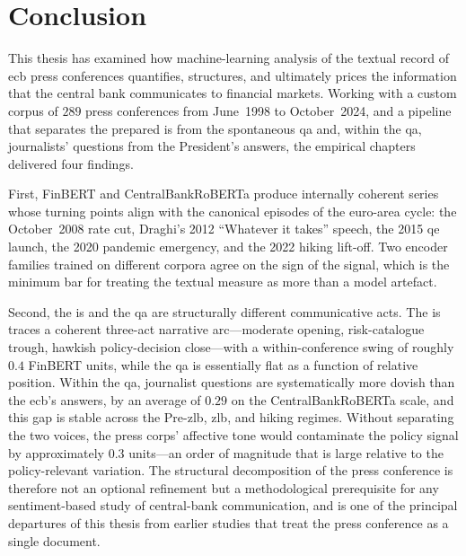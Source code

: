 \chapter*{Conclusion} %

This thesis has examined how machine-learning analysis of the textual record of \gls{ecb} press conferences quantifies, structures, and ultimately prices the information that the central bank communicates to financial markets. Working with a custom corpus of $289$ press conferences from June~1998 to October~2024, and a pipeline that separates the prepared \gls{is} from the spontaneous \gls{qa} and, within the \gls{qa}, journalists' questions from the President's answers, the empirical chapters delivered four findings.

First, FinBERT and CentralBankRoBERTa produce internally coherent series whose turning points align with the canonical episodes of the euro-area cycle: the October~2008 rate cut, Draghi's 2012 ``Whatever it takes'' speech, the 2015 \gls{qe} launch, the 2020 pandemic emergency, and the 2022 hiking lift-off. Two encoder families trained on different corpora agree on the sign of the signal, which is the minimum bar for treating the textual measure as more than a model artefact.

Second, the \gls{is} and the \gls{qa} are structurally different communicative acts. The \gls{is} traces a coherent three-act narrative arc---moderate opening, risk-catalogue trough, hawkish policy-decision close---with a within-conference swing of roughly $0.4$ FinBERT units, while the \gls{qa} is essentially flat as a function of relative position. Within the \gls{qa}, journalist questions are systematically more dovish than the \gls{ecb}'s answers, by an average of $0.29$ on the CentralBankRoBERTa scale, and this gap is stable across the Pre-\gls{zlb}, \gls{zlb}, and hiking regimes. Without separating the two voices, the press corps' affective tone would contaminate the policy signal by approximately $0.3$ units---an order of magnitude that is large relative to the policy-relevant variation. The structural decomposition of the press conference is therefore not an optional refinement but a methodological prerequisite for any sentiment-based study of central-bank communication, and is one of the principal departures of this thesis from earlier studies that treat the press conference as a single document.

